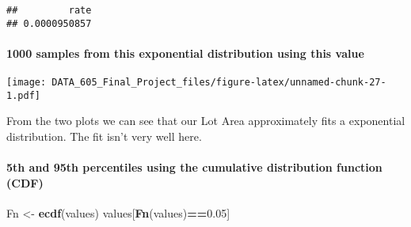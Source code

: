\documentclass[]{article}
\newenvironment{Shaded}{\begin{snugshade}}{\end{snugshade}}
\newcommand{\CommentTok}[1]{\textcolor[rgb]{0.56,0.35,0.01}{\textit{#1}}}
\newcommand{\DataTypeTok}[1]{\textcolor[rgb]{0.13,0.29,0.53}{#1}}
\newcommand{\DecValTok}[1]{\textcolor[rgb]{0.00,0.00,0.81}{#1}}
\newcommand{\FloatTok}[1]{\textcolor[rgb]{0.00,0.00,0.81}{#1}}
\newcommand{\KeywordTok}[1]{\textcolor[rgb]{0.13,0.29,0.53}{\textbf{#1}}}
\newcommand{\NormalTok}[1]{#1}
\newcommand{\OperatorTok}[1]{\textcolor[rgb]{0.81,0.36,0.00}{\textbf{#1}}}
\newcommand{\OtherTok}[1]{\textcolor[rgb]{0.56,0.35,0.01}{#1}}
\newcommand{\StringTok}[1]{\textcolor[rgb]{0.31,0.60,0.02}{#1}}
\let\oldparagraph\paragraph
\renewcommand{\paragraph}[1]{\oldparagraph{#1}\mbox{}}
\begin{document}
\begin{verbatim}
##         rate 
## 0.0000950857
\end{verbatim}

\hypertarget{samples-from-this-exponential-distribution-using-this-value}{%
\paragraph{1000 samples from this exponential distribution using this
value}\label{samples-from-this-exponential-distribution-using-this-value}}

\begin{Shaded}
\end{Shaded}

\texttt{[image: DATA\_605\_Final\_Project\_files/figure-latex/unnamed-chunk-27-1.pdf]}

From the two plots we can see that our Lot Area approximately fits a
exponential distribution. The fit isn't very well here.

\hypertarget{th-and-95th-percentiles-using-the-cumulative-distribution-function-cdf}{%
\paragraph{5th and 95th percentiles using the cumulative distribution
function
(CDF)}\label{th-and-95th-percentiles-using-the-cumulative-distribution-function-cdf}}

\begin{Shaded}
\begin{Highlighting}[]
\NormalTok{Fn <-}\StringTok{ }\KeywordTok{ecdf}\NormalTok{(values)}
\NormalTok{values[}\KeywordTok{Fn}\NormalTok{(values)}\OperatorTok{==}\FloatTok{0.05}\NormalTok{]}
\end{Highlighting}
\end{Shaded}
\end{document}
